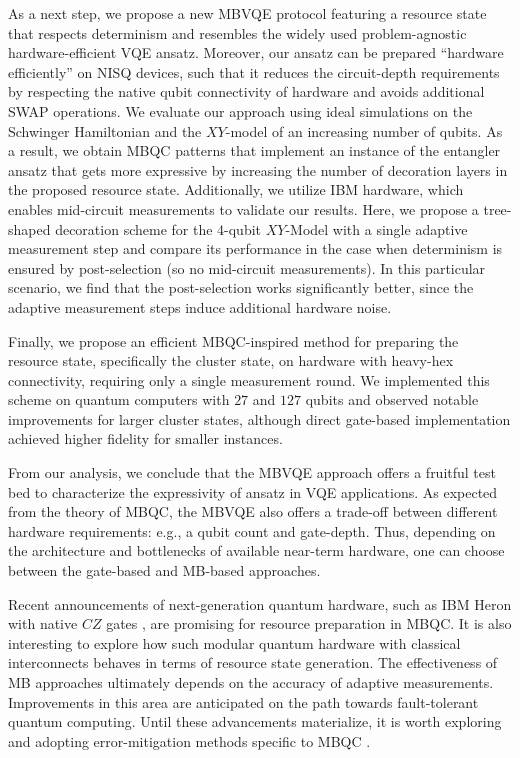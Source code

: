 \documentclass[../main.tex]{subfiles}
\begin{document}
As a next step, we propose a new MBVQE protocol featuring a resource state that respects determinism and resembles the widely used problem-agnostic hardware-efficient VQE ansatz. Moreover, our ansatz can be prepared ``hardware efficiently'' on NISQ devices, such that it reduces the circuit-depth requirements by respecting the native qubit connectivity of hardware and avoids additional SWAP operations. We evaluate our approach using ideal simulations on the Schwinger Hamiltonian and the $XY$-model of an increasing number of qubits. As a result, we obtain MBQC patterns that implement an instance of the entangler ansatz that gets more expressive by increasing the number of decoration layers in the proposed resource state. Additionally, we utilize IBM hardware, which enables mid-circuit measurements to validate our results. 
Here, we propose a tree-shaped decoration scheme for the $4$-qubit $XY$-Model with a single adaptive measurement step and compare its performance in the case when determinism is ensured by post-selection (so no mid-circuit measurements). 
In this particular scenario, we find that the post-selection works significantly better, since the adaptive measurement steps induce additional hardware noise.

Finally, we propose an efficient MBQC-inspired method for preparing the resource state, specifically the cluster state, on hardware with heavy-hex connectivity, requiring only a single measurement round. We implemented this scheme on quantum computers with $27$ and $127$ qubits and observed notable improvements for larger cluster states, although direct gate-based implementation achieved higher fidelity for smaller instances.

From our analysis, we conclude that the MBVQE approach offers a fruitful test bed to characterize the expressivity of ansatz in VQE applications. As expected from the theory of MBQC, the MBVQE also offers a trade-off between different hardware requirements: e.g., a qubit count and gate-depth. Thus, depending on the architecture and bottlenecks of available near-term hardware, one can choose between the gate-based and MB-based approaches.

Recent announcements of next-generation quantum hardware, such as IBM Heron with native $CZ$ gates \cite{mckay2023benchmarking}, are promising for resource preparation in MBQC. It is also interesting to explore how such modular quantum hardware with classical interconnects behaves in terms of resource state generation.
The effectiveness of MB approaches ultimately depends on the accuracy of adaptive measurements. Improvements in this area are anticipated on the path towards fault-tolerant quantum computing. Until these advancements materialize, it is worth exploring and adopting error-mitigation methods specific to MBQC \cite{gupta2023probabilistic}.
\end{document}
